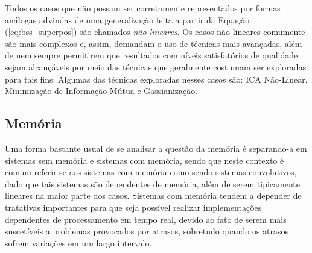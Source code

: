 \noindent Todos os casos que não possam ser corretamente representados por formas análogas advindas de uma generalização feita a partir da Equação (\ref{eq:bss_superpos}) são chamados \textit{não-lineares}. Os casos não-lineares comumente são mais complexos e, assim, demandam o uso de técnicas mais avançadas, além de nem sempre permitirem que resultados com níveis satisfatórios de qualidade sejam alcançáveis por meio das técnicas que geralmente costumam ser exploradas para tais fins. Algumas das técnicas exploradas nesses casos são: ICA Não-Linear, Minimização de Informação Mútua e Gassianização.



\subsection{Memória}
\label{subsec:bss_memory}

Uma forma bastante usual de se analisar a questão da memória é separando-a em sistemas sem memória e sistemas com memória, sendo que neste contexto é comum referir-se aos sistemas com memória como sendo sistemas convolutivos, dado que tais sistemas são dependentes de memória, além de serem tipicamente lineares na maior parte dos casos. Sistemas com memória tendem a depender de tratativas importantes para que seja possível realizar implementações dependentes de processamento em tempo real, devido ao fato de serem mais suscetíveis a problemas provocados por atrasos, sobretudo quando os atrasos sofrem variações em um largo intervalo.\\

